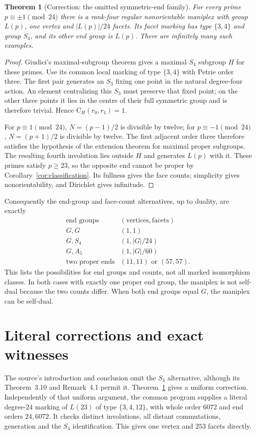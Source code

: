 \documentclass[11pt]{article}
\newtheorem{theorem}{Theorem}
\newcommand{\CG}{\mathrm C}
\begin{document}
\begin{theorem}[Correction: the omitted symmetric-end family]
\label{thm:S4}
For every prime $p\equiv\pm1\pmod{24}$ there is a rank-four regular
nonorientable maniplex with group $L(p)$, one vertex and $|L(p)|/24$
facets. Its facet marking has type $\{3,4\}$ and group $S_4$, and its
other end group is $L(p)$. There are infinitely many such examples.
\end{theorem}
\begin{proof}
Giudici's maximal-subgroup theorem gives a maximal $S_4$ subgroup
$H$ for these primes. Use its common local marking of type $\{3,4\}$
with Petrie order three. The first pair generates an $S_3$ fixing one
point in the natural degree-four action. An element centralizing this
$S_3$ must preserve that fixed point; on the other three points it lies
in the centre of their full symmetric group and is therefore trivial.
Hence $\CG_H(r_0,r_1)=1$.

For $p\equiv1\pmod{24}$, $N=(p-1)/2$ is divisible by twelve; for
$p\equiv-1\pmod{24}$, $N=(p+1)/2$ is divisible by twelve.
The first adjacent order three therefore satisfies the hypothesis of
the extension theorem for maximal proper subgroups. The resulting fourth involution lies outside $H$
and generates $L(p)$ with it. These primes satisfy $p\ge23$, so the
opposite end cannot be proper by Corollary~\ref{cor:classification}.
Its fullness gives the face counts; simplicity gives nonorientability,
and Dirichlet gives infinitude.
\end{proof}

Consequently the end-group and face-count alternatives, up to duality,
are exactly
\[
\begin{array}{c|c}
\text{end groups}&(\text{vertices},\text{facets})\\\hline
G,G&(1,1)\\
G,S_4&(1,|G|/24)\\
G,A_5&(1,|G|/60)\\
\text{two proper ends}&(11,11)\text{ or }(57,57).
\end{array}
\]
This lists the possibilities for end groups and counts, not all marked
isomorphism classes. In both cases with exactly one proper end group, the maniplex is not
self-dual because the two counts differ. When both end groups equal $G$,
the maniplex can be self-dual.

\section{Literal corrections and exact witnesses}
The source's introduction and conclusion omit the $S_4$ alternative,
although its Theorem~3.10 and Remark~4.1 permit it.
Theorem~\ref{thm:S4} gives a uniform correction. Independently of that
uniform argument, the common program supplies a literal degree-$24$
marking of $L(23)$ of type $\{3,4,12\}$, with whole order $6072$ and
end orders $24,6072$. It checks distinct involutions, all distant
commutations, generation and the $S_4$ identification. This gives one
vertex and $253$ facets directly.
\end{document}

